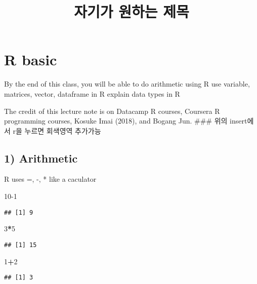 \documentclass[
]{article}
\title{자기가 원하는 제목}
\author{}
\date{\vspace{-2.5em}}
\newenvironment{Shaded}{\begin{snugshade}}{\end{snugshade}}
\newcommand{\DecValTok}[1]{\textcolor[rgb]{0.00,0.00,0.81}{#1}}
\newcommand{\OperatorTok}[1]{\textcolor[rgb]{0.81,0.36,0.00}{\textbf{#1}}}
\begin{document}
\maketitle

\hypertarget{r-basic}{%
\section{R basic}\label{r-basic}}

By the end of this class, you will be able to do arithmetic using R use
variable, matrices, vector, dataframe in R explain data types in R

The credit of this lecture note is on Datacamp R courses, Coursera R
programming courses, Kosuke Imai (2018), and Bogang Jun. \#\#\# 위의
insert에서 r을 누르면 회색영역 추가가능

\hypertarget{arithmetic}{%
\subsection{1) Arithmetic}\label{arithmetic}}

R uses =, -, * like a caculator

\begin{Shaded}
\begin{Highlighting}[]
  \DecValTok{10-1}
\end{Highlighting}
\end{Shaded}

\begin{verbatim}
## [1] 9
\end{verbatim}

\begin{Shaded}
\begin{Highlighting}[]
  \DecValTok{3}\OperatorTok{*}\DecValTok{5}
\end{Highlighting}
\end{Shaded}

\begin{verbatim}
## [1] 15
\end{verbatim}

\begin{Shaded}
\begin{Highlighting}[]
  \DecValTok{1}\OperatorTok{+}\DecValTok{2}
\end{Highlighting}
\end{Shaded}

\begin{verbatim}
## [1] 3
\end{verbatim}
\end{document}
